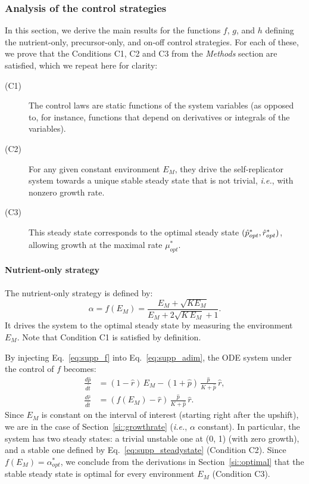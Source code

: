 \subsubsection{Analysis of the control strategies}
\label{si::control_strategies}

In this section, we derive the main results for the functions $f$, $g$, and $h$ defining the nutrient-only, precursor-only, and on-off control strategies.
For each of these, we prove that the Conditions C1, C2 and C3 from the \textit{Methods} section are satisfied, which we repeat here for clarity:
\begin{description}
\item[(C1)] The control laws are static functions of the system variables (as opposed to, for instance, functions that depend on derivatives or integrals of the variables).
\item[(C2)] For any given constant environment $E_M$, they drive the self-rep\-li\-cat\-or system towards a unique stable steady state that is not trivial, \textit{i.e.}, with nonzero growth rate.
\item[(C3)] This steady state corresponds to the optimal steady state $(\hat{p}_{opt}^*, \linebreak \hat{r}_{opt}^*)$, allowing growth at the maximal rate $\mu^*_{opt}$.
\end{description}

\paragraph{Nutrient-only strategy}

The nutrient-only strategy is defined by:
\begin{equation}
\label{eq:supp_f}
\alpha = f(E_M) = \frac{E_M + \sqrt{K E_M}}{E_M + 2\sqrt{K\, E_M} + 1}.
\end{equation}
It drives the system to the optimal steady state by measuring the environment $E_M$.
Note that Condition C1 is satisfied by definition.

By injecting Eq.~\ref{eq:supp_f} into Eq.~\ref{eq:supp_adim}, the ODE system under the control of $f$ becomes:
\begin{equation}
\label{eq:supp_adim_f}
\begin{aligned}
\frac{d\hat{p}}{d\hat{t}} &= (1-\hat{r})\, E_M - (1 + \hat{p}) \, \frac{\hat{p}}{K + \hat{p}}\, \hat{r},\\
\frac{d\hat{r}}{d\hat{t}} &= \left(f(E_M) - \hat{r} \right) \, \frac{\hat{p}}{K + \hat{p}}\, \hat{r}.
\end{aligned}
\end{equation}
Since $E_M$ is constant on the interval of interest (starting right after the upshift), we are in the case of Section~\ref{si::growthrate} (\textit{i.e.}, $\alpha$ constant).
In particular, the system has two steady states: a trivial unstable one at (0, 1) (with zero growth), and a stable one defined by Eq.~\ref{eq:supp_steadystate} (Condition C2).
Since $f(E_M) = \alpha_{opt}^*$, we conclude from the derivations in Section~\ref{si::optimal} that the stable steady state is optimal for every environment $E_M$ (Condition C3).

